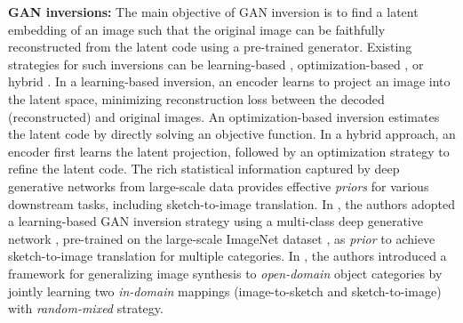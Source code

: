 \noindent
\textbf{GAN inversions:} The main objective of GAN inversion is to find a latent embedding of an image such that the original image can be faithfully reconstructed from the latent code using a pre-trained generator. Existing strategies for such inversions can be learning-based \cite{an2023sketchinverter,bau2019inverting,perarnau2016invertible,zhu2016generative}, optimization-based \cite{abdal2019image2stylegan,abdal2020image2stylegan++,creswell2018inverting,lipton2017precise,ma2018invertibility,ramesh2019spectral,voynov2020unsupervised}, or hybrid \cite{bau2019seeing,zhu2020domain}. In a learning-based inversion, an encoder learns to project an image into the latent space, minimizing reconstruction loss between the decoded (reconstructed) and original images. An optimization-based inversion estimates the latent code by directly solving an objective function. In a hybrid approach, an encoder first learns the latent projection, followed by an optimization strategy to refine the latent code. The rich statistical information captured by deep generative networks from large-scale data provides effective \emph{priors} for various downstream tasks, including sketch-to-image translation. In \cite{an2023sketchinverter}, the authors adopted a learning-based GAN inversion strategy using a multi-class deep generative network \cite{brock2018large}, pre-trained on the large-scale ImageNet dataset \cite{deng2009imagenet}, as \emph{prior} to achieve sketch-to-image translation for multiple categories. In \cite{xiang2022adversarial}, the authors introduced a framework for generalizing image synthesis to \emph{open-domain} object categories by jointly learning two \emph{in-domain} mappings (image-to-sketch and sketch-to-image) with \emph{random-mixed} strategy.

\vspace{1.0em}

